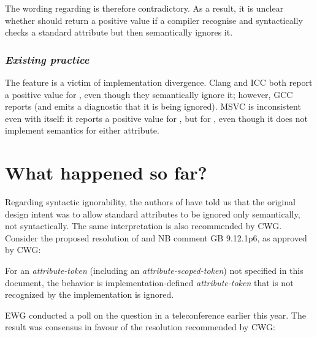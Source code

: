 The wording regarding \mbox{} is therefore contradictory. As a result, it is unclear whether \mbox{} should return a positive value if a compiler recognise and syntactically checks a standard attribute but then semantically ignores it. 

\subsubsection*{\emph{Existing practice}}

The \mbox{} feature is a victim of implementation divergence. Clang and ICC both report a positive value for \mbox{}, even though they semantically ignore it; however, GCC reports  (and emits a diagnostic that it is being ignored). MSVC is inconsistent even with itself: it reports a positive value for \mbox{}, but  for \mbox{}, even though it does not implement semantics for either attribute.

\section{What happened so far?}

Regarding syntactic ignorability, the authors of \cite{N2761} have told us that the original design intent was to allow standard attributes to be ignored only semantically, not syntactically. The same interpretation is also recommended by CWG. Consider the proposed resolution of \cite{CWG2538} and NB comment GB 9.12.1p6, as approved by CWG:

\begin{adjustwidth}{0.5cm}{0.5cm}
For an \emph{attribute-token} (including an \emph{attribute-scoped-token})  not specified in this document, the behavior is implementation-defined \emph{attribute-token} that is not recognized by the implementation is ignored.

\end{adjustwidth}

EWG conducted a poll on the question in a teleconference earlier this year. The result was consensus in favour of the resolution recommended by CWG:

